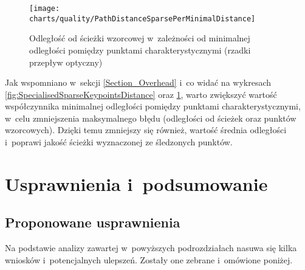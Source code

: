       \begin{figure}[!ht]
        \centering
        \texttt{[image: charts/quality/PathDistanceSparsePerMinimalDistance]}
        \caption[Odległość od ścieżki wzorcowej w~zależności od minimalnej odległości pomiędzy punktami
                 charakterystycznymi]
                {Odległość od ścieżki wzorcowej w~zależności od minimalnej odległości pomiędzy punktami
                 charakterystycznymi (rzadki przepływ optyczny)}
        \label{fig:SpecialisedSparsePathDistance}
      \end{figure}

    Jak wspomniano w~sekcji \ref{Section_Overhead} i~co widać na wykresach \ref{fig:SpecialisedSparseKeypointsDistance} oraz \ref{fig:SpecialisedSparsePathDistance}, warto zwiększyć wartość współczynnika minimalnej odległości pomiędzy punktami charakterystycznymi, w~celu zmniejszenia maksymalnego błędu (odległości od ścieżek oraz punktów wzorcowych). Dzięki temu zmniejszy się również, wartość średnia odległości i~poprawi jakość ścieżki wyznaczonej ze śledzonych punktów.

\chapter{Usprawnienia i~podsumowanie}\label{Chapter_Podsumowanie}

  \section{Proponowane usprawnienia}\label{Section_Usprawnienia}

    Na podstawie analizy zawartej w~powyższych podrozdziałach nasuwa się kilka wniosków i~potencjalnych ulepszeń. Zostały one zebrane i~omówione poniżej.

